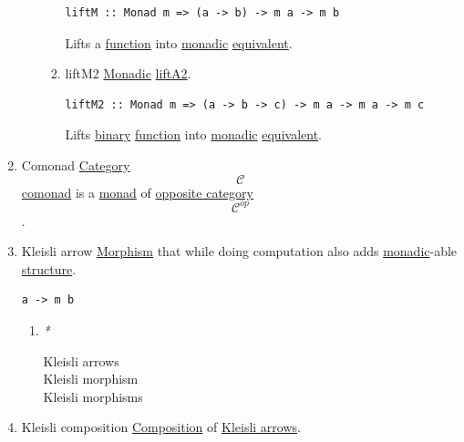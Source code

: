 \documentclass[11pt]{article}
\begin{document}
\begin{enumerate}
\begin{enumerate}
\begin{enumerate}
\begin{verbatim}
liftM :: Monad m => (a -> b) -> m a -> m b
\end{verbatim}

Lifts a \hyperref[orge15bc14]{function} into \hyperref[orgad51197]{monadic} \hyperref[orgff529d7]{equivalent}.\\

\item \label{orgff8fa0f}liftM2
\label{sec:org71fecc5}
\hyperref[orgad51197]{Monadic} \hyperref[orga958644]{liftA2}.\\
\begin{verbatim}
liftM2 :: Monad m => (a -> b -> c) -> m a -> m a -> m c
\end{verbatim}

Lifts \hyperref[org57bd48f]{binary} \hyperref[orge15bc14]{function} into \hyperref[orgad51197]{monadic} \hyperref[orgff529d7]{equivalent}.\\
\end{enumerate}
\end{enumerate}

\item \label{org600382d}Comonad
\label{sec:org9794538}
\hyperref[org0450535]{Category} $$ \mathcal{C} $$ \hyperref[org600382d]{comonad} is a \hyperref[org86a5d95]{monad} of \hyperref[org99d1f00]{opposite category} $$ \mathcal{C}^{op} $$.\\

\item \label{org12f613d}Kleisli arrow
\label{sec:orgeecb408}
\hyperref[org5de09d4]{Morphism} that while doing computation also adds \hyperref[orgad51197]{monadic}-able \hyperref[org8051f61]{structure}.\\

\begin{verbatim}
a -> m b
\end{verbatim}

\begin{enumerate}
\item \emph{*}
\label{sec:org3ad66b9}

\label{orgd96c93e}Kleisli arrows\\
\label{orga63288f}Kleisli morphism\\
\label{org0070676}Kleisli morphisms\\
\end{enumerate}

\item \label{org0ada36c}Kleisli composition
\label{sec:org2717a0e}
\hyperref[orga128e7f]{Composition} of \hyperref[orgd96c93e]{Kleisli arrows}.\\


\end{enumerate}
\end{document}
